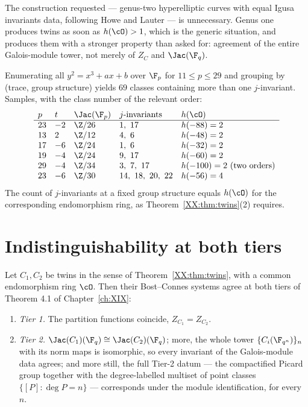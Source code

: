 \begin{remark}\label{XX:rem:overengineer}
The construction requested --- genus-two hyperelliptic curves with equal Igusa invariants
data, following Howe \cite{HowePP} and Lauter \cite{Lauter} --- is unnecessary. Genus one produces twins as soon as
$h(\cO)>1$, which is the generic situation, and produces them with a stronger property than
asked for: agreement of the entire Galois-module tower, not merely of $Z_C$ and
$\Jac(\F_q)$.
\end{remark}

\begin{example}[Enumeration]\label{XX:ex:enum}
Enumerating all $y^2=x^3+ax+b$ over $\F_p$ for $11\le p\le29$ and grouping by (trace, group
structure) yields $69$ classes containing more than one $j$-invariant. Samples, with the
class number of the relevant order:
\[
\begin{array}{lllll}
p & t & \Jac(\F_p) & j\text{-invariants} & h(\cO)\\\hline
23 & -2 & \Z/26 & 1,\ 17 & h(-88)=2\\
13 & 2 & \Z/12 & 4,\ 6 & h(-48)=2\\
17 & -6 & \Z/24 & 1,\ 6 & h(-32)=2\\
19 & -4 & \Z/24 & 9,\ 17 & h(-60)=2\\
29 & -4 & \Z/34 & 3,\ 7,\ 17 & h(-100)=2\ \text{(two orders)}\\
23 & -6 & \Z/30 & 14,\ 18,\ 20,\ 22 & h(-56)=4
\end{array}
\]
The count of $j$-invariants at a fixed group structure equals $h(\cO)$ for the corresponding
endomorphism ring, as Theorem~\ref{XX:thm:twins}(2) requires.
\end{example}

\section{Indistinguishability at both tiers}

\begin{theorem}\label{XX:thm:invisible}
Let $C_1,C_2$ be twins in the sense of Theorem~\ref{XX:thm:twins}, with a common endomorphism
ring $\cO$. Then their Bost--Connes systems agree at both tiers of Theorem 4.1 of Chapter~\ref{ch:XIX}:
\begin{enumerate}
\item \emph{Tier 1.} The partition functions coincide, $Z_{C_1}=Z_{C_2}$.
\item \emph{Tier 2.} $\Jac(C_1)(\F_q)\cong\Jac(C_2)(\F_q)$; more, the whole tower
$\{C_i(\F_{q^n})\}_n$ with its norm maps is isomorphic, so every invariant of the
Galois-module data agrees; and more still, the full Tier-2 datum --- the compactified Picard
group together with the degree-labelled multiset of point classes $\{[P]:\deg P=n\}$ ---
corresponds under the module identification, for every $n$.
\end{enumerate}
\end{theorem}

